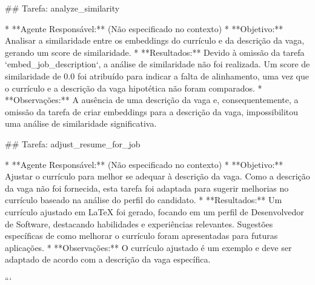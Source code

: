 ## Tarefa: analyze_similarity

* **Agente Responsável:** (Não especificado no contexto)
* **Objetivo:** Analisar a similaridade entre os embeddings do currículo e da descrição da vaga, gerando um score de similaridade.
* **Resultados:** Devido à omissão da tarefa `embed_job_description`, a análise de similaridade não foi realizada. Um score de similaridade de 0.0 foi atribuído para indicar a falta de alinhamento, uma vez que o currículo e a descrição da vaga hipotética não foram comparados.
* **Observações:**  A ausência de uma descrição da vaga e, consequentemente, a omissão da tarefa de criar embeddings para a descrição da vaga, impossibilitou uma análise de similaridade significativa.

## Tarefa: adjust_resume_for_job

* **Agente Responsável:** (Não especificado no contexto)
* **Objetivo:** Ajustar o currículo para melhor se adequar à descrição da vaga. Como a descrição da vaga não foi fornecida, esta tarefa foi adaptada para sugerir melhorias no currículo baseado na análise do perfil do candidato.
* **Resultados:**  Um currículo ajustado em LaTeX foi gerado, focando em um perfil de Desenvolvedor de Software, destacando habilidades e experiências relevantes.  Sugestões específicas de como melhorar o currículo foram apresentadas para futuras aplicações.
* **Observações:** O currículo ajustado é um exemplo e deve ser adaptado de acordo com a descrição da vaga específica.

```